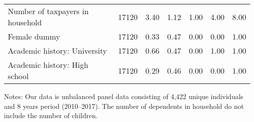\begin{table}
\begin{threeparttable}
\begin{tabular}[t]{lcccccc}
\hspace{1em}Number of taxpayers in household & 17120 & \num{3.40} & \num{1.12} & \num{1.00} & \num{4.00} & \num{8.00}\\
\hspace{1em}Female dummy & 17120 & \num{0.33} & \num{0.47} & \num{0.00} & \num{0.00} & \num{1.00}\\
\hspace{1em}Academic history: University & 17120 & \num{0.66} & \num{0.47} & \num{0.00} & \num{1.00} & \num{1.00}\\
\hspace{1em}Academic history: High school & 17120 & \num{0.29} & \num{0.46} & \num{0.00} & \num{0.00} & \num{1.00}\\
\bottomrule
\end{tabular}
\begin{tablenotes}
\item Notes: Our data is unbalanced panel data consisting of 4,422 unique individuals and 8 years period (2010--2017). The number of dependents in household do not include the number of children.
\end{tablenotes}
\end{threeparttable}
\end{table}
